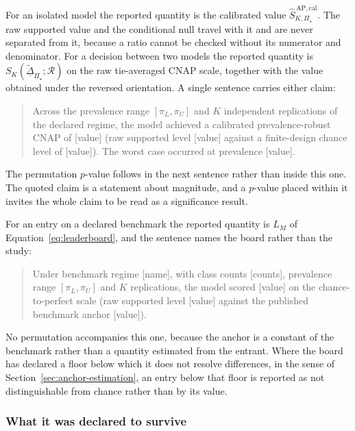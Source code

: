 \documentclass[11pt]{article}
\newcommand{\Regime}{\mathcal{R}}
\newcommand{\PSet}{\Pi_\star}
\newcommand{\SRobCalHat}{\widehat S_{K,\PSet}^{\,\mathrm{AP,cal}}}
\newcommand{\RobDta}{\underline{\widetilde{\Delta}}_{\PSet}}
\theoremstyle{remark}
\begin{document}
For an isolated model the reported quantity is the calibrated value $\SRobCalHat$. The raw supported value and the conditional null travel with it and are never separated from it, because a ratio cannot be checked without its numerator and denominator. For a decision between two models the reported quantity is $S_K(\RobDta;\Regime)$ on the raw tie-averaged CNAP scale, together with the value obtained under the reversed orientation. A single sentence carries either claim:

\begin{quote}
Across the prevalence range $[\pi_L,\pi_U]$ and $K$ independent replications of the declared regime, the model achieved a calibrated prevalence-robust CNAP of [value] (raw supported level [value] against a finite-design chance level of [value]). The worst case occurred at prevalence [value].
\end{quote}

The permutation $p$-value follows in the next sentence rather than inside this one. The quoted claim is a statement about magnitude, and a $p$-value placed within it invites the whole claim to be read as a significance result.

For an entry on a declared benchmark the reported quantity is $L_M$ of Equation~\eqref{eq:leaderboard}, and the sentence names the board rather than the study:

\begin{quote}
Under benchmark regime [name], with class counts [counts], prevalence range $[\pi_L,\pi_U]$ and $K$ replications, the model scored [value] on the chance-to-perfect scale (raw supported level [value] against the published benchmark anchor [value]).
\end{quote}

No permutation accompanies this one, because the anchor is a constant of the benchmark rather than a quantity estimated from the entrant. Where the board has declared a floor below which it does not resolve differences, in the sense of Section~\ref{sec:anchor-estimation}, an entry below that floor is reported as not distinguishable from chance rather than by its value.

\subsubsection*{What it was declared to survive}
\end{document}
